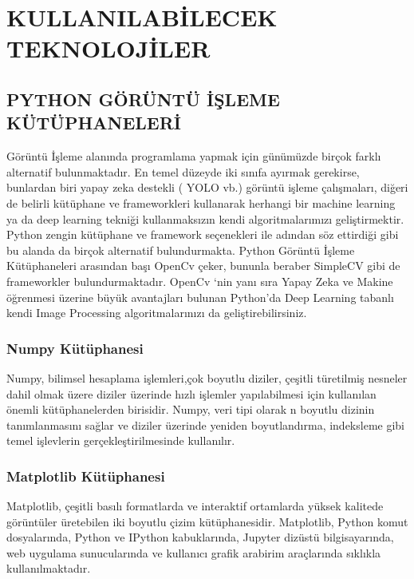 \chapter{KULLANILABİLECEK TEKNOLOJİLER}\label{CH2}
\section{PYTHON GÖRÜNTÜ İŞLEME KÜTÜPHANELERİ}
\cite{artifical}
Görüntü İşleme alanında programlama yapmak için günümüzde birçok farklı alternatif bulunmaktadır. En temel düzeyde iki sınıfa ayırmak gerekirse, bunlardan biri yapay zeka destekli ( YOLO vb.) görüntü işleme çalışmaları, diğeri de belirli kütüphane ve frameworkleri kullanarak herhangi bir machine learning ya da deep learning tekniği kullanmaksızın kendi  algoritmalarımızı geliştirmektir.
Python zengin kütüphane ve framework seçenekleri ile adından söz ettirdiği gibi bu alanda da birçok alternatif bulundurmakta. Python Görüntü İşleme Kütüphaneleri arasından başı OpenCv çeker, bununla beraber SimpleCV gibi de frameworkler bulundurmaktadır. OpenCv ‘nin yanı sıra Yapay Zeka ve Makine öğrenmesi üzerine büyük avantajları bulunan Python’da Deep Learning tabanlı kendi Image Processing algoritmalarınızı da geliştirebilirsiniz.

\subsection{Numpy Kütüphanesi}
Numpy, bilimsel hesaplama işlemleri,çok boyutlu diziler, çeşitli türetilmiş nesneler dahil olmak üzere diziler üzerinde hızlı işlemler yapılabilmesi için kullanılan önemli kütüphanelerden birisidir.
Numpy, veri tipi olarak n boyutlu dizinin tanımlanmasını sağlar ve diziler üzerinde yeniden boyutlandırma, indeksleme gibi temel işlevlerin gerçekleştirilmesinde kullanılır.\\
\subsection{Matplotlib Kütüphanesi}
Matplotlib, çeşitli basılı formatlarda ve interaktif ortamlarda yüksek kalitede görüntüler üretebilen iki boyutlu çizim kütüphanesidir. Matplotlib, Python komut dosyalarında, Python ve IPython kabuklarında, Jupyter dizüstü bilgisayarında, web uygulama sunucularında ve kullanıcı grafik arabirim araçlarında sıklıkla kullanılmaktadır. \\
